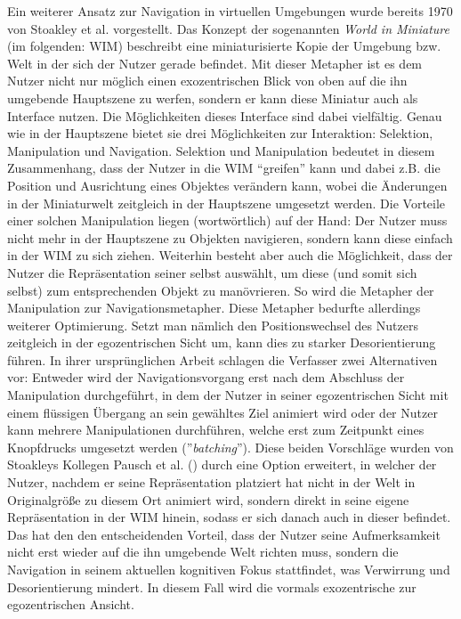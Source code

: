 Ein weiterer Ansatz zur Navigation in virtuellen Umgebungen wurde bereits 1970 von Stoakley et al. \cite{Stoakley2010VirtualWIM} vorgestellt. Das Konzept der sogenannten \textit{World in Miniature} (im folgenden: WIM) beschreibt eine miniaturisierte Kopie der Umgebung bzw. Welt in der sich der Nutzer gerade befindet. Mit dieser Metapher ist es dem Nutzer nicht nur möglich einen exozentrischen Blick von oben auf die ihn umgebende Hauptszene zu werfen, sondern er kann diese Miniatur auch als Interface nutzen. Die Möglichkeiten dieses Interface sind dabei vielfältig. Genau wie in der Hauptszene bietet sie drei Möglichkeiten zur Interaktion: Selektion, Manipulation und Navigation.
Selektion und Manipulation bedeutet in diesem Zusammenhang, dass der Nutzer in die WIM “greifen” kann und dabei z.B. die Position und Ausrichtung eines Objektes verändern kann, wobei die Änderungen in der Miniaturwelt zeitgleich in der Hauptszene umgesetzt werden. Die Vorteile einer solchen Manipulation liegen (wortwörtlich) auf der Hand: Der Nutzer muss nicht mehr in der Hauptszene zu Objekten navigieren, sondern kann diese einfach in der WIM zu sich ziehen. 
Weiterhin besteht aber auch die Möglichkeit, dass der Nutzer die Repräsentation seiner selbst auswählt, um diese (und somit sich selbst) zum entsprechenden Objekt zu manövrieren. So wird die Metapher der Manipulation zur Navigationsmetapher.
Diese Metapher bedurfte allerdings weiterer Optimierung. Setzt man nämlich den Positionswechsel des Nutzers zeitgleich in der egozentrischen Sicht um, kann dies zu starker Desorientierung führen. In ihrer ursprünglichen Arbeit schlagen die Verfasser zwei Alternativen vor: Entweder wird der Navigationsvorgang erst nach dem Abschluss der Manipulation durchgeführt, in dem der Nutzer in seiner egozentrischen Sicht mit einem flüssigen Übergang an sein gewähltes Ziel animiert wird oder der Nutzer kann mehrere Manipulationen durchführen, welche erst zum Zeitpunkt eines Knopfdrucks umgesetzt werden (”\textit{batching}”). 
Diese beiden Vorschläge wurden von Stoakleys Kollegen Pausch et al. (\cite{5_pausch_WIM}) durch eine Option erweitert, in welcher der Nutzer, nachdem er seine Repräsentation platziert hat nicht in der Welt in Originalgröße zu diesem Ort animiert wird, sondern direkt in seine eigene Repräsentation in der WIM hinein, sodass er sich danach auch in dieser befindet.
Das hat den den entscheidenden Vorteil, dass der Nutzer seine Aufmerksamkeit nicht erst wieder auf die ihn umgebende Welt richten muss, sondern die Navigation in seinem aktuellen kognitiven Fokus stattfindet, was Verwirrung und Desorientierung mindert. In diesem Fall wird die vormals exozentrische zur egozentrischen Ansicht.
